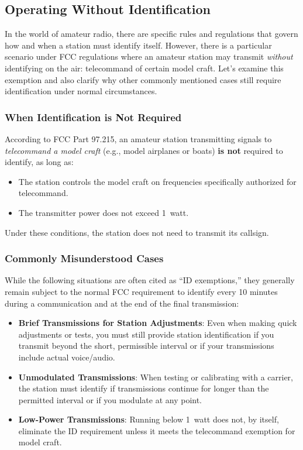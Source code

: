 \subsection{Operating Without Identification}
\label{subsec:operating-no-id}

In the world of amateur radio, there are specific rules and regulations that govern how and when a station must identify itself. However, there is a particular scenario under FCC regulations where an amateur station may transmit \emph{without} identifying on the air: telecommand of certain model craft. Let's examine this exemption and also clarify why other commonly mentioned cases still require identification under normal circumstances.

\subsubsection*{When Identification is Not Required}
According to FCC Part 97.215, an amateur station transmitting signals to \emph{telecommand a model craft} (e.g., model airplanes or boats) \textbf{is not} required to identify, as long as:
\begin{itemize}[noitemsep]    \item The station controls the model craft on frequencies specifically authorized for telecommand.
    \item The transmitter power does not exceed 1~watt.
\end{itemize}
Under these conditions, the station does not need to transmit its callsign.

\subsubsection*{Commonly Misunderstood Cases}
While the following situations are often cited as ``ID exemptions,'' they generally remain subject to the normal FCC requirement to identify every 10 minutes during a communication and at the end of the final transmission:

\begin{itemize}[noitemsep]    \item \textbf{Brief Transmissions for Station Adjustments}: Even when making quick adjustments or tests, you must still provide station identification if you transmit beyond the short, permissible interval or if your transmissions include actual voice/audio.  
    \item \textbf{Unmodulated Transmissions}: When testing or calibrating with a carrier, the station must identify if transmissions continue for longer than the permitted interval or if you modulate at any point.  
    \item \textbf{Low-Power Transmissions}: Running below 1~watt does not, by itself, eliminate the ID requirement unless it meets the telecommand exemption for model craft.
\end{itemize}

